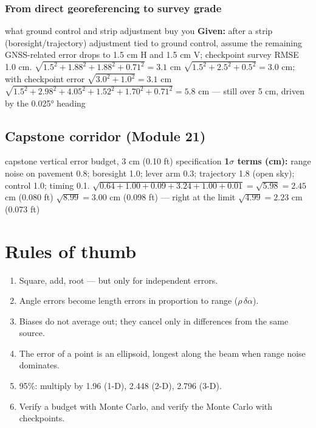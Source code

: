 \subsubsection*{From direct georeferencing to survey grade}
\begin{worked}{what ground control and strip adjustment buy you}
\textbf{Given:} after a strip (boresight/trajectory) adjustment tied to ground control, assume the remaining GNSS-related error drops to 1.5 cm H and 1.5 cm V; checkpoint survey RMSE 1.0 cm.
 $\sqrt{1.5^2+1.88^2+1.88^2+0.71^2}=3.1$ cm
 $\sqrt{1.5^2+2.5^2+0.5^2}=3.0$ cm; with checkpoint error $\sqrt{3.0^2+1.0^2}=3.1$ cm
 $\sqrt{1.5^2+2.98^2+4.05^2+1.52^2+1.70^2+0.71^2}=5.8$ cm --- still over 5 cm, driven by the 0.025° heading
\end{worked}


\subsection{Capstone corridor (Module 21)}\label{sec:bud-cap}
\begin{worked}{capstone vertical error budget, 3 cm (0.10 ft) specification}
\textbf{1$\sigma$ terms (cm):} range noise on pavement 0.8; boresight 1.0; lever arm 0.3; trajectory 1.8 (open sky); control 1.0; timing 0.1.
 $\sqrt{0.64+1.00+0.09+3.24+1.00+0.01}=\sqrt{5.98}=2.45$ cm (0.080 ft) \checkmark
{} $\sqrt{8.99}=3.00$ cm (0.098 ft) --- right at the limit \texttimes
{} $\sqrt{4.99}=2.23$ cm (0.073 ft) \checkmark
{}
\end{worked}

\section{Rules of thumb}
\begin{enumerate}
\item Square, add, root --- but only for independent errors.
\item Angle errors become length errors in proportion to range ($\rho\,\delta\alpha$).
\item Biases do not average out; they cancel only in differences from the same source.
\item The error of a point is an ellipsoid, longest along the beam when range noise dominates.
\item 95\%: multiply by 1.96 (1-D), 2.448 (2-D), 2.796 (3-D).
\item Verify a budget with Monte Carlo, and verify the Monte Carlo with checkpoints.
\end{enumerate}

